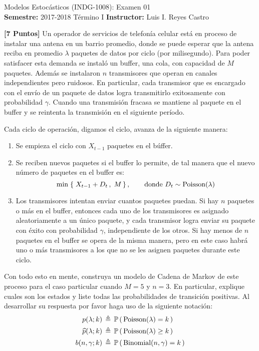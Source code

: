 \documentclass[ a4paper, twoside, 11pt]{article}
\newcommand{\numero}{01}
\begin{document}
\allowdisplaybreaks

\begin{center}
\Large Modelos Estoc\'asticos (INDG-1008): Examen \numero \\[1ex]
\small \textbf{Semestre:} 2017-2018 T\'ermino I \qquad
\textbf{Instructor:} Luis I. Reyes Castro
\end{center}
\fullskip




\begin{problem}
\textbf{[7 Puntos]} Un operador de servicios de telefon\'ia celular est\'a en proceso de instalar una antena en un barrio promedio, donde se puede esperar que la antena reciba en promedio $\lambda$ paquetes de datos por ciclo (\eg por milisegundo). Para poder satisfacer esta demanda se instal\'o un buffer, \ie una cola, con capacidad de $M$ paquetes. Adem\'as se instalaron $n$ transmisores que operan en canales independientes pero ruidosos. En particular, cada transmisor que es encargado con el env\'io de un paquete de datos logra transmitirlo exitosamente con probabilidad $\gamma$. Cuando una transmisi\'on fracasa se mantiene al paquete en el buffer y se reintenta la transmisi\'on en el siguiente per\'iodo. 

Cada ciclo de operaci\'on, digamos el \tavo ciclo, avanza de la siguiente manera: 
\begin{enumerate}
\item Se empieza el ciclo con $X_{t-1}$ paquetes en el b\'uffer. 
\item Se reciben nuevos paquetes si el buffer lo permite, de tal manera que el nuevo n\'umero de paquetes en el buffer es: 
\[
\min \; \{ \; X_{t-1} + D_t \, , \; M \, \} \, ,
\qquad \text{donde } D_t \sim \text{Poisson}(\lambda)
\]
\item Los transmisores intentan enviar cuantos paquetes puedan. Si hay $n$ paquetes o m\'as en el buffer, entonces cada uno de los transmisores es asignado aleatoriamente a un \'unico paquete, y cada transmisor logra enviar su paquete con \'exito con probabilidad $\gamma$, independiente de los otros. Si hay menos de $n$ paquetes en el buffer se opera de la misma manera, pero en este caso habr\'a uno o m\'as transmisores a los que no se les asignen paquetes durante este ciclo. 
\end{enumerate}

Con todo esto en mente, construya un modelo de Cadena de Markov de este proceso para el caso particular cuando $M = 5$ y $n = 3$. En particular, explique cuales son los estados y liste todas las probabilidades de transici\'on positivas. Al desarrollar su respuesta por favor haga uso de la siguiente notaci\'on: 
\begin{align*}
p(\lambda;k) \, 
& \triangleq \, \mathbb{P} \, ( \, \text{Poisson}(\lambda) = k \, ) \\
\widehat{p}(\lambda;k) \, 
& \triangleq \, \mathbb{P} \, ( \, \text{Poisson}(\lambda) \geq k \, ) \\
b(n,\gamma;k) \, 
& \triangleq \, \mathbb{P} \, ( \, \text{Binomial}(n,\gamma) = k \, )
\end{align*}


\end{problem}
\end{document}
